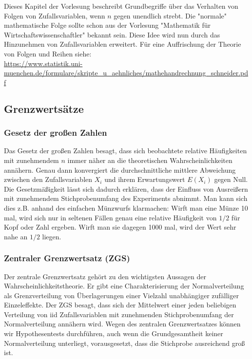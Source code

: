 \documentclass[a4paper]{article}
\begin{document}
Dieses Kapitel der Vorlesung beschreibt Grundbegriffe über das Verhalten von Folgen von Zufallsvariablen, wenn $n$ gegen unendlich strebt. Die "normale" mathematische Folge sollte schon aus der Vorlesung "Mathematik für Wirtschaftswissenschaftler" bekannt sein. Diese Idee wird nun durch das Hinzunehmen von Zufallsvariablen erweitert. Für eine Auffrischung der Theorie von Folgen und Reihen siehe:\\
\url{https://www.statistik.uni-muenchen.de/formulare/skripte_u_aehnliches/mathehandrechnung_schneider.pdf}

\subsection{Grenzwertsätze}\label{sec:GWS}
\subsubsection{Gesetz der großen Zahlen}\label{sec:LLN}

Das Gesetz der großen Zahlen besagt, dass sich beobachtete relative Häufigkeiten mit zunehmendem $n$ immer näher an die theoretischen Wahrscheinlichkeiten annähern. Genau dann konvergiert die durchschnittliche mittlere Abweichung zwischen den Zufallsvariablen $X_i$ und ihrem Erwartungswert $E(X_i)$ gegen Null. Die Gesetzmäßigkeit lässt sich dadurch erklären, dass der Einfluss von Ausreißern mit zunehmendem Stichprobenumfang des Experiments abnimmt. Man kann sich dies z.B. anhand des einfachen Münzwurfs klarmachen: Wirft man eine Münze 10 mal, wird sich nur in seltenen Fällen genau eine relative Häufigkeit von $1/2$ für Kopf oder Zahl ergeben. Wirft man sie dagegen 1000 mal, wird der Wert sehr nahe an $1/2$ liegen. 


\subsubsection{Zentraler Grenzwertsatz (ZGS)}\label{sec:ZGS}
Der zentrale Grenzwertsatz gehört zu den wichtigsten Aussagen der Wahrscheinlichkeitstheorie. Er gibt eine Charakterisierung der Normalverteilung als Grenzverteilung von Überlagerungen einer Vielzahl unabhängiger zufälliger Einzeleffekte. Der ZGS besagt, dass sich der Mittelwert einer jeden beliebigen Verteilung von iid Zufallsvariablen mit zunehmenden Stichprobenumfang der Normalverteilung annähern wird. Wegen des zentralen Grenzwertsatzes können wir Hypothesentests durchführen, auch wenn die Grundgesamtheit keiner Normalverteilung unterliegt, vorausgesetzt, dass die Stichprobe ausreichend groß ist.\\
\end{document}
